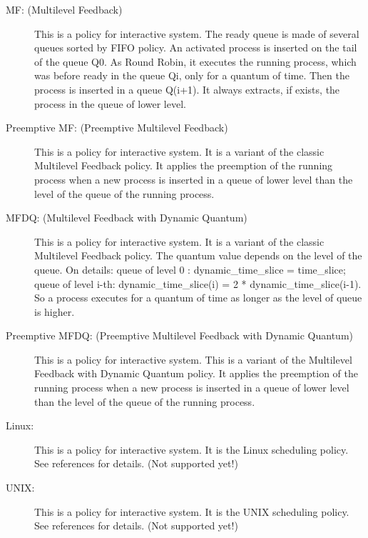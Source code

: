 \documentclass[10pt,a4paper,twoside,titlepage]{article}
\begin{document}
\begin{description}
 \item [MF: (Multilevel Feedback)] This is a policy for interactive system. The ready queue is made of several queues sorted by FIFO policy. An activated process is inserted on the tail of the queue Q0. As Round Robin, it executes the running process, which was before ready in the queue Qi, only for a quantum of time. Then the process is inserted in a queue Q(i+1). It always extracts, if exists, the process in the queue of lower level. 
 \item [Preemptive MF: (Preemptive Multilevel Feedback)] This is a policy for interactive system. It is a variant of the classic Multilevel Feedback policy. It applies the preemption of the running process when a new process is inserted in a queue of lower level than the level of the queue of the running process. 
 \item [MFDQ: (Multilevel Feedback with Dynamic Quantum)] This is a policy for interactive system. It is a variant of the classic Multilevel Feedback policy. The quantum value depends on the level of the queue. On details: queue of level 0 : dynamic\_time\_slice = time\_slice; queue of level i-th: dynamic\_time\_slice(i) = 2 * dynamic\_time\_slice(i-1). So a process executes for a quantum of time as longer as the level of queue is higher. 
 \item [Preemptive MFDQ: (Preemptive Multilevel Feedback with Dynamic Quantum)] This is a policy for interactive system. This is a variant of the Multilevel Feedback with Dynamic Quantum policy. It applies the preemption of the running process when a new process is inserted in a queue of lower level than the level of the queue of the running process. 
 \item [Linux:] This is a policy for interactive system. It is the Linux scheduling policy. See references for details. (Not supported yet!)
 \item [UNIX:] This is a policy for interactive system. It is the UNIX scheduling policy. See references for details. (Not supported yet!)
\end{description}
\end{document}
